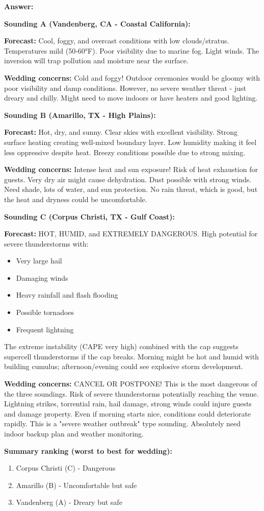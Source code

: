 \documentclass[letterpaper, 11pt]{article}
\newcommand{\1}{\mathds{1}}	%
\theoremstyle{definition}
\begin{document}
\textbf{Answer:}

\textbf{Sounding A (Vandenberg, CA - Coastal California):}

\textbf{Forecast:} Cool, foggy, and overcast conditions with low clouds/stratus. Temperatures mild (50-60°F). Poor visibility due to marine fog. Light winds. The inversion will trap pollution and moisture near the surface.

\textbf{Wedding concerns:} Cold and foggy! Outdoor ceremonies would be gloomy with poor visibility and damp conditions. However, no severe weather threat - just dreary and chilly. Might need to move indoors or have heaters and good lighting.

\textbf{Sounding B (Amarillo, TX - High Plains):}

\textbf{Forecast:} Hot, dry, and sunny. Clear skies with excellent visibility. Strong surface heating creating well-mixed boundary layer. Low humidity making it feel less oppressive despite heat. Breezy conditions possible due to strong mixing.

\textbf{Wedding concerns:} Intense heat and sun exposure! Risk of heat exhaustion for guests. Very dry air might cause dehydration. Dust possible with strong winds. Need shade, lots of water, and sun protection. No rain threat, which is good, but the heat and dryness could be uncomfortable.

\textbf{Sounding C (Corpus Christi, TX - Gulf Coast):}

\textbf{Forecast:} HOT, HUMID, and EXTREMELY DANGEROUS. High potential for severe thunderstorms with:
\begin{itemize}
    \item Very large hail
    \item Damaging winds
    \item Heavy rainfall and flash flooding
    \item Possible tornadoes
    \item Frequent lightning
\end{itemize}
The extreme instability (CAPE very high) combined with the cap suggests supercell thunderstorms if the cap breaks. Morning might be hot and humid with building cumulus; afternoon/evening could see explosive storm development.

\textbf{Wedding concerns:} CANCEL OR POSTPONE! This is the most dangerous of the three soundings. Risk of severe thunderstorms potentially reaching the venue. Lightning strikes, torrential rain, hail damage, strong winds could injure guests and damage property. Even if morning starts nice, conditions could deteriorate rapidly. This is a "severe weather outbreak" type sounding. Absolutely need indoor backup plan and weather monitoring.

\textbf{Summary ranking (worst to best for wedding):}
\begin{enumerate}
    \item Corpus Christi (C) - Dangerous
    \item Amarillo (B) - Uncomfortable but safe
    \item Vandenberg (A) - Dreary but safe
\end{enumerate}
\end{document}
